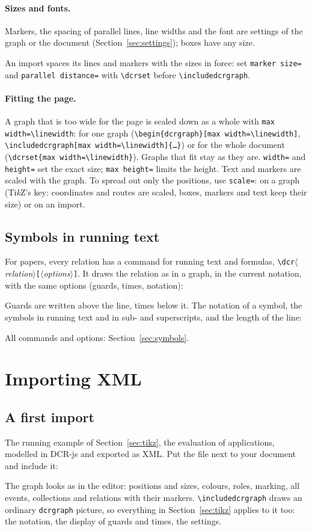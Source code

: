 \documentclass[a4paper,11pt]{article}
\newcommand\example[1]{%
  \begin{tcolorbox}[colback=white, colframe=black!25, boxrule=0.4pt,
      arc=1mm, left=2mm, right=2mm, halign lower=flush center]
    
    \tcblower
    
  \end{tcolorbox}}
\newcommand\cs[1]{\texttt{\textbackslash#1}}
\newcommand\key[1]{\texttt{#1}}
\newcommand\meta[1]{\ensuremath{\langle}\textit{#1}\ensuremath{\rangle}}
\newcommand\oarg[1]{\texttt{[}\meta{#1}\texttt{]}}
\begin{document}
\paragraph{Sizes and fonts.} Markers, the spacing of parallel lines, line
widths and the font are settings of the graph or the document
(Section~\ref{sec:settings}); boxes have any size.
\example{sizes}
An import spaces its lines and markers with the sizes in force: set
\key{marker size=} and \key{parallel distance=} with \cs{dcrset} before
\cs{includedcrgraph}.

\paragraph{Fitting the page.} A graph that is too wide for the page is
scaled down as a whole with \key{max width=\cs{linewidth}}: for one graph
(\cs{begin\{dcrgraph\}[max width=\cs{linewidth}]},
\cs{includedcrgraph[max width=\cs{linewidth}]\{\dots\}}) or for the whole
document (\cs{dcrset\{max width=\cs{linewidth}\}}). Graphs that fit stay as
they are. \key{width=} and \key{height=} set the exact size;
\key{max height=} limits the height. Text and markers are scaled with the
graph. To spread out only the positions, use \key{scale=}: on a graph
(Ti\emph{k}Z's key: coordinates and routes are scaled, boxes, markers and
text keep their size) or on an import.

\subsection{Symbols in running text}
For papers, every relation has a command for running text and formulas,
\cs{dcr}\meta{relation}\oarg{options}. It draws the relation as in a graph,
in the current notation, with the same options (guards, times, notation):
\example{inline}
Guards are written above the line, times below it. The notation of a
symbol, the symbols in running text and in sub- and superscripts, and the
length of the line:
\example{inline-options}
All commands and options: Section~\ref{sec:symbols}.

\section{Importing XML}\label{sec:import}

\subsection{A first import}
The running example of Section~\ref{sec:tikz}, the evaluation of
applications, modelled in DCR-js and exported as XML. Put the file next to
your document and include it:
\example{import-default}
The graph looks as in the editor: positions and sizes, colours, roles,
marking, all events, collections and relations with their markers.
\cs{includedcrgraph} draws an ordinary \texttt{dcrgraph} picture, so
everything in Section~\ref{sec:tikz} applies to it too: the notation, the
display of guards and times, the settings.
\end{document}
